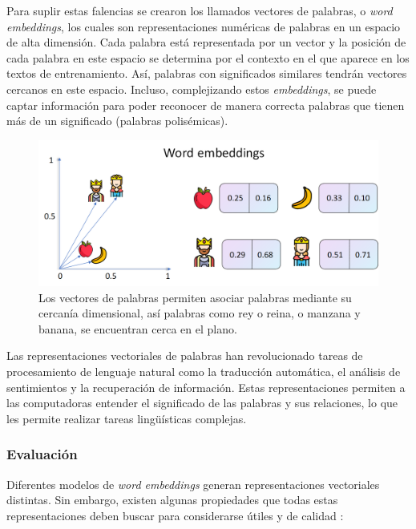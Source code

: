 Para suplir estas falencias se crearon los llamados vectores de palabras, o \textit{word embeddings}, los cuales son representaciones numéricas de palabras en un espacio de alta dimensión. Cada palabra está representada por un vector y la posición de cada palabra en este espacio se determina por el contexto en el que aparece en los textos de entrenamiento. Así, palabras con significados similares tendrán vectores cercanos en este espacio. Incluso, complejizando estos \textit{embeddings}, se puede captar información para poder reconocer de manera correcta palabras que tienen más de un significado (palabras polisémicas). \parencite{liu2020surveycontextualembeddings}

\begin{figure}[H]
    \centering
    \includegraphics[width=1\textwidth]{imagenes/word_embeddings.png}
    \caption{Los vectores de palabras permiten asociar palabras mediante su cercanía dimensional, así palabras como rey o reina, o manzana y banana, se encuentran cerca en el plano.}
    \label{fig:word_embbeding}
\end{figure}

Las representaciones vectoriales de palabras han revolucionado tareas de procesamiento de lenguaje natural como la traducción automática, el análisis de sentimientos y la recuperación de información. \parencite{sentimentanalysisspanishtweets} Estas representaciones permiten a las computadoras entender el significado de las palabras y sus relaciones, lo que les permite realizar tareas lingüísticas complejas.

\subsubsection{Evaluación}

Diferentes modelos de \textit{word embeddings} generan representaciones vectoriales distintas. Sin embargo, existen algunas propiedades que todas estas representaciones deben buscar para considerarse útiles y de calidad \parencite{Wang_2019}:

